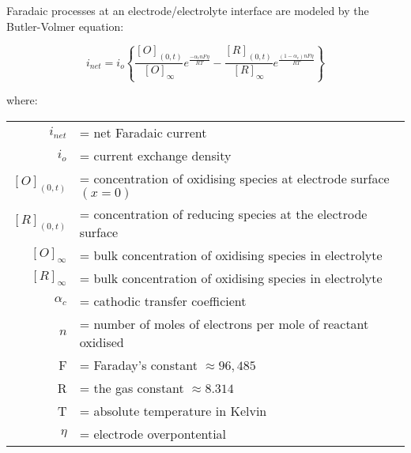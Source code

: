 Faradaic processes at an electrode/electrolyte interface are modeled
by the Butler-Volmer equation:

\begin{equation}
i_{net}=i_{o}\left\{ \frac{[O]_{(0,t)}}{[O]_{\infty}}e^{\frac{-\alpha_{c}nF\eta}{RT}}-\frac{[R]_{(0,t)}}{[R]_{\infty}}e^{\frac{(1-\alpha_{c})nF\eta}{RT}}\right\}
\end{equation}


where:

\begin{tabular}{rl}
$i_{net}$ & = net Faradaic current\tabularnewline
$i_{o}$ & = current exchange density\tabularnewline
$[O]_{(0,t)}$ & = concentration of oxidising species at electrode surface $(x=0)$\tabularnewline
$[R]_{(0,t)}$ & = concentration of reducing species at the electrode surface\tabularnewline
$[O]_{\infty}$ & = bulk concentration of oxidising species in electrolyte\tabularnewline
$[R]_{\infty}$ & = bulk concentration of oxidising species in electrolyte\tabularnewline
$\alpha_{c}$ & = cathodic transfer coefficient\tabularnewline
$n$ & = number of moles of electrons per mole of reactant oxidised\tabularnewline
F & = Faraday's constant $\approx96,485$\tabularnewline
R & = the gas constant $\approx8.314$\tabularnewline
T & = absolute temperature in Kelvin\tabularnewline
$\eta$ & = electrode overpontential\tabularnewline
\end{tabular}

